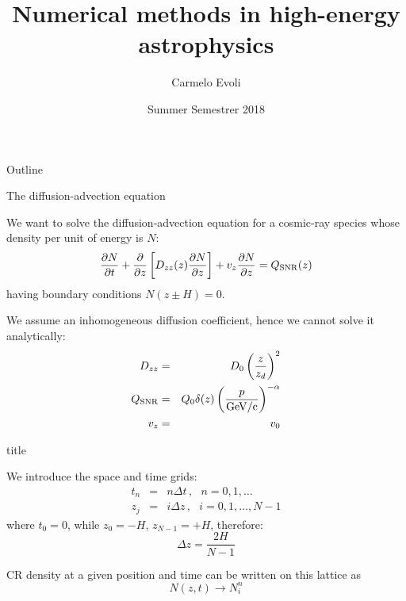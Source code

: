 \documentclass[9pt]{beamer}
\author[C.~Evoli]{Carmelo Evoli}
\institute[GSSI]{Gran Sasso Science Institute}
\title[Numerical methods in HEA]{Numerical methods in high-energy astrophysics}
\date[2018]{Summer Semestrer 2018}
\begin{document}
\begin{frame}
\titlepage
\end{frame}

\begin{frame}{Outline}
\tableofcontents
\end{frame}

\begin{frame}{The diffusion-advection equation}

We want to solve the diffusion-advection equation for a cosmic-ray species whose density per unit of energy is $N$:
%
\begin{equation*}
\frac{\partial N}{\partial t} 
+\frac{\partial}{\partial z} \left[ D_{zz}(z) \frac{\partial N}{\partial z} \right]
+v_z \frac{\partial N}{\partial z}
= Q_{\rm SNR}(z)
\end{equation*}
%
having boundary conditions $N(z \pm H) = 0$.

We assume an {\color{orange}inhomogeneous} diffusion coefficient, hence we cannot solve it analytically:
%
\begin{eqnarray*}
D_{zz} & = & D_0 \left( \frac{z}{z_d} \right)^{2} \\
Q_{\rm SNR} & = & Q_0 \delta(z) \left( \frac{p}{\rm GeV/c} \right)^{-\alpha} \\
v_z & = & v_0
\end{eqnarray*}
\end{frame}

\begin{frame}{title}

We introduce the space and time grids: 
%
\begin{eqnarray*}
t_n & = & n \Delta t \, , \,\,\,\,  n = 0, 1, \dots  \\ 
z_j & = & i \Delta z \, , \,\,\,\,  i = 0, 1, \dots, N-1
\end{eqnarray*}
%
where
%
$t_0 = 0$, while $z_0 = -H$, $z_{N-1} = +H$, therefore:
%
\begin{equation*}
\Delta z = \frac{2H}{N - 1}
\end{equation*}

CR density at a given position and time can be written on this lattice as
%
\begin{equation*}
N(z, t) \rightarrow N_i^n
\end{equation*}

\end{frame}
\end{document}
